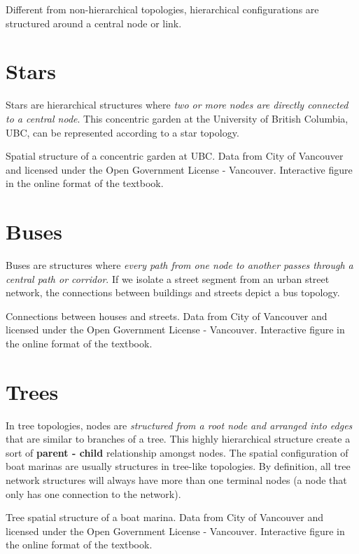 \documentclass[
]{book}
\begin{document}
Different from non-hierarchical topologies, hierarchical configurations are structured around a central node or link.

\hypertarget{stars}{%
\section{Stars}\label{stars}}

Stars are hierarchical structures where \emph{two or more nodes are directly connected to a central node}. This concentric garden at the University of British Columbia, UBC, can be represented according to a star topology.

\label{fig:unnamed-chunk-17}Spatial structure of a concentric garden at UBC. Data from City of Vancouver and licensed under the Open Government License - Vancouver. Interactive figure in the online format of the textbook.

\hypertarget{buses}{%
\section{Buses}\label{buses}}

Buses are structures where \emph{every path from one node to another passes through a central path or corridor}. If we isolate a street segment from an urban street network, the connections between buildings and streets depict a bus topology.

\label{fig:unnamed-chunk-18}Connections between houses and streets. Data from City of Vancouver and licensed under the Open Government License - Vancouver. Interactive figure in the online format of the textbook.

\hypertarget{trees}{%
\section{Trees}\label{trees}}

In tree topologies, nodes are \emph{structured from a root node and arranged into edges} that are similar to branches of a tree. This highly hierarchical structure create a sort of \textbf{parent - child} relationship amongst nodes. The spatial configuration of boat marinas are usually structures in tree-like topologies. By definition, all tree network structures will always have more than one terminal nodes (a node that only has one connection to the network).

\label{fig:unnamed-chunk-19}Tree spatial structure of a boat marina. Data from City of Vancouver and licensed under the Open Government License - Vancouver. Interactive figure in the online format of the textbook.
\end{document}
